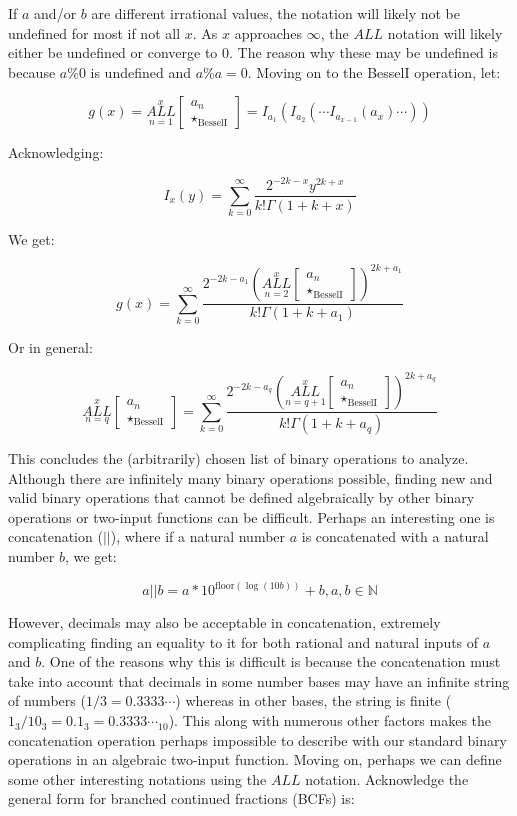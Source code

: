 \documentclass{article}
\begin{document}
If $a$ and/or $b$ are different irrational values, the notation will likely not be undefined for most if not all $x$. As $x$ approaches $\infty$, the $ALL$ notation will likely either be undefined or converge to 0. The reason why these may be undefined is because $a\%0$ is undefined and $a\%a=0$. Moving on to the BesselI operation, let:

$$g(x) = \underset{n=1}{\overset{x}{ALL}} \begin{bmatrix}
a_n \\
\star_{\text{BesselI}}
\end{bmatrix}=I_{a_1}(I_{a_2}(\cdots I_{a_{x-1}}(a_x) \cdots))$$

Acknowledging:

$$I_x(y) = \underset{k=0}{\overset{\infty}{\sum}} \frac{2^{-2k-x}y^{2k+x}}{k! \Gamma(1+k+x)}$$

We get:

$$g(x)=\underset{k=0}{\overset{\infty}{\sum}} \frac{2^{-2k-a_1}(\underset{n=2}{\overset{x}{ALL}} \begin{bmatrix}
a_n \\
\star_{\text{BesselI}}
\end{bmatrix})^{2k+a_1}}{k! \Gamma(1+k+a_1)}$$

Or in general:

$$\underset{n=q}{\overset{x}{ALL}} \begin{bmatrix}
a_n \\
\star_{\text{BesselI}}
\end{bmatrix}=\underset{k=0}{\overset{\infty}{\sum}} \frac{2^{-2k-a_q}(\underset{n=q+1}{\overset{x}{ALL}} \begin{bmatrix}
a_n \\
\star_{\text{BesselI}}
\end{bmatrix})^{2k+a_q}}{k! \Gamma(1+k+a_q)}$$

This concludes the (arbitrarily) chosen list of binary operations to analyze. Although there are infinitely many binary operations possible, finding new and valid binary operations that cannot be defined algebraically by other binary operations or two-input functions can be difficult. Perhaps an interesting one is concatenation ($||$), where if a natural number $a$ is concatenated with a natural number $b$, we get:

$$a || b = a*10^{\text{floor}(\log(10b))}+b, a,b \in \mathbb{N}$$

However, decimals may also be acceptable in concatenation, extremely complicating finding an equality to it for both rational and natural inputs of $a$ and $b$. One of the reasons why this is difficult is because the concatenation must take into account that decimals in some number bases may have an infinite string of numbers ($1 / 3= 0.3333\cdots$) whereas in other bases, the string is finite ($1_3 / 10_3 = 0.1_3 = 0.3333\cdots_{10}$). This along with numerous other factors makes the concatenation operation perhaps impossible to describe with our standard binary operations in an algebraic two-input function. Moving on, perhaps we can define some other interesting notations using the $ALL$ notation. Acknowledge the general form for branched continued fractions (BCFs) is:
\end{document}
